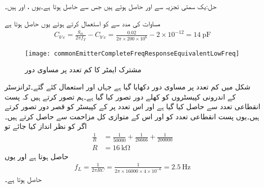 حل:یک سمتی  تجزیہ سے  اور  حاصل ہوتے ہیں جس سے  حاصل ہوتا ہے۔یوں ،  اور  ہیں۔

مساوات  کی مدد سے  کو استعمال کرتے ہوئے  یوں حاصل ہوتا ہے
\begin{align*}
C_{b'e} = \frac{g_m}{2 \pi  f_T}-C_{b'c}=\frac{0.02}{2 \pi  \times 200 \times 10^6}-2 \times 10^{-12}=\SI{14}{\pico \farad}
\end{align*}
%
\begin{figure}
\centering
\texttt{[image: commonEmitterCompleteFreqResponseEquivalentLowFreq]}
\caption{مشترک ایمٹر کا کم تعدد پر مساوی دور}
\label{شکل_تعددی_ردعمل_مشترک_مخارج_مکمل_تعددی_ردعمل_کم_تعددی_مساوی}
\end{figure}

شکل  میں کم تعدد پر مساوی دور دکھایا گیا ہے جہاں  اور  استعمال کئے گئے۔ٹرانزسٹر کے اندرونی کپیسٹروں کو کھلے دور تصور کیا گیا ہے۔ہم تصور کرتے ہیں کہ پست انقطاعی تعدد  سے حاصل کیا گیا ہے  اور اس تعدد پر  کے کپیسٹر کو قصر    دور تصور کرتے ہیں۔یوں پست انقطاعی تعدد  کو   اور اس کے متوازی کل مزاحمت  سے حاصل کرتے ہیں۔اگر  کو نظر انداز کیا جائے تو
\begin{align*}
\frac{1}{R}&=\frac{1}{50000}+\frac{1}{26666}+\frac{1}{200000}\\
R&=\SI{16}{\kilo \ohm}
\end{align*}
حاصل ہوتا ہے اور یوں
\begin{align*}
f_L=\frac{1}{2 \pi R C}=\frac{1}{2 \pi \times 16000 \times 4 \times 10^{-6}}=\SI{2.5}{\hertz}
\end{align*}
حاصل ہوتا ہے۔

